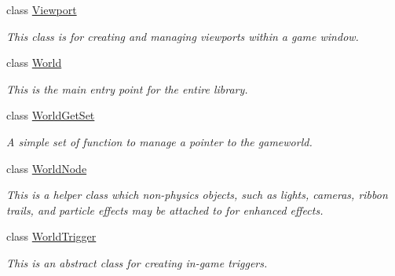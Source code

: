 \begin{DoxyCompactItemize}
class \hyperlink{classphys_1_1Viewport}{Viewport}
\begin{DoxyCompactList}\small\item\em This class is for creating and managing viewports within a game window. \item\end{DoxyCompactList}\item 
class \hyperlink{classphys_1_1World}{World}
\begin{DoxyCompactList}\small\item\em This is the main entry point for the entire library. \item\end{DoxyCompactList}\item 
class \hyperlink{classphys_1_1WorldGetSet}{WorldGetSet}
\begin{DoxyCompactList}\small\item\em A simple set of function to manage a pointer to the gameworld. \item\end{DoxyCompactList}\item 
class \hyperlink{classphys_1_1WorldNode}{WorldNode}
\begin{DoxyCompactList}\small\item\em This is a helper class which non-\/physics objects, such as lights, cameras, ribbon trails, and particle effects may be attached to for enhanced effects. \item\end{DoxyCompactList}\item 
class \hyperlink{classphys_1_1WorldTrigger}{WorldTrigger}
\begin{DoxyCompactList}\small\item\em This is an abstract class for creating in-\/game triggers. \item\end{DoxyCompactList}\end{DoxyCompactItemize}
